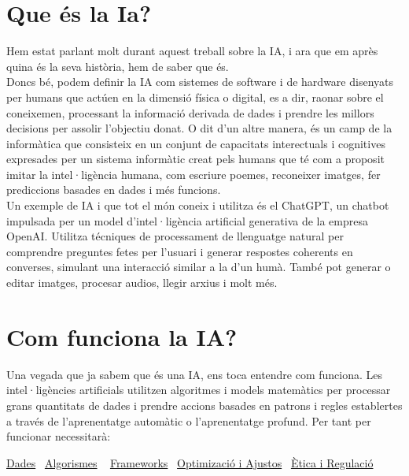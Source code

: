 \section{Que és la Ia?}
Hem estat parlant molt durant aquest treball sobre la IA, i ara que em après quina és la seva història, hem de saber que és. \\
Doncs bé, podem definir la IA com sistemes de software i de hardware disenyats per humans que actúen en la dimensió física o digital, es a dir, raonar sobre el coneixemen, processant la informació derivada de dades i prendre les millors decisions per assolir l'objectiu donat. O dit d'un altre manera, és un camp de la informàtica que consisteix en un conjunt de capacitats interectuals i cognitives expresades per un sistema informàtic creat pels humans que té com a proposit imitar la intel·ligència humana, com escriure poemes, reconeixer imatges, fer prediccions basades en dades i més funcions. \\
Un exemple de IA i que tot el món coneix i utilitza és el ChatGPT, un chatbot impulsada per un model d'intel·ligència artificial generativa de la empresa OpenAI. Utilitza técniques de processament de llenguatge natural per comprendre preguntes fetes per l'usuari i generar respostes coherents en converses, simulant una interacció similar a la d'un humà. També pot generar o editar imatges, procesar audios, llegir arxius i molt més.

\section{Com funciona la IA?}
Una vegada que ja sabem que és una IA, ens toca entendre com funciona.
Les intel·ligències artificials utilitzen algoritmes i models matemàtics per processar grans quantitats de dades
i prendre accions basades en patrons i regles establertes a través de l'aprenentatge automàtic o l'aprenentatge profund.
Per tant per funcionar necessitarà:

 \hyperlink{Dades}{Dades} \
  \hyperlink{Algorismes}{Algorismes} \
  \hyperlink{Software i Frameworks}{Frameworks} \
   \hyperlink{Optimització i Ajustos}{Optimizació i Ajustos} \
   \hyperlink{Ètica i Regulació}{Ètica i Regulació}

